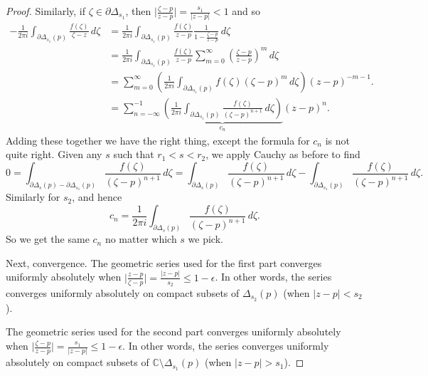 \documentclass[12pt,openany]{book}
\newcommand{\sabs}[1]{\lvert {#1} \rvert}
\newcommand{\babs}[1]{\bigl\lvert {#1} \bigr\rvert}
\newcommand{\C}{{\mathbb{C}}}
\theoremstyle{plain}
\theoremstyle{remark}
\theoremstyle{definition}
\theoremstyle{exercise}
\theoremstyle{example}
\begin{document}
\begin{proof}
Similarly, 
if $\zeta \in \partial \Delta_{s_1}$, then
$\babs{\frac{\zeta-p}{z-p}} = \frac{s_1}{\sabs{z-p}} < 1$ and so
\begin{equation*}
\begin{split}
-\frac{1}{2\pi i}
\int_{\partial \Delta_{s_1}(p)} \frac{f(\zeta)}{\zeta-z} \, d\zeta 
& = 
\frac{1}{2\pi i}
\int_{\partial \Delta_{s_1}(p)} \frac{f(\zeta)}{z-p}
\frac{1}{1-\frac{\zeta-p}{z-p}} \, d\zeta
\\
& =
\frac{1}{2\pi i}
\int_{\partial \Delta_{s_1}(p)} \frac{f(\zeta)}{z-p}
\sum_{m=0}^\infty
{\left(\frac{\zeta-p}{z-p}\right)}^m \, d\zeta
\\
& =
\sum_{m=0}^\infty
\left(
\frac{1}{2\pi i}
\int_{\partial \Delta_{s_1}(p)} f(\zeta){(\zeta-p)}^{m}
 \, d\zeta
\right)
{(z-p)}^{-m-1} .
\\
& =
\sum_{n=-\infty}^{-1}
\underbrace{
\left(
\frac{1}{2\pi i}
\int_{\partial \Delta_{s_1}(p)} \frac{f(\zeta)}{{(\zeta-p)}^{n+1}}
 \, d\zeta
\right)
}_{c_n}
{(z-p)}^{n} .
\end{split}
\end{equation*}
Adding these together we have the right thing, except the formula for $c_n$
is not quite right.  Given any $s$ such that
$r_1 < s < r_2$, we apply Cauchy as before to find
\begin{equation*}
0 = \int_{\partial \Delta_{s}(p) - \partial \Delta_{s_1}(p)}
\frac{f(\zeta)}{{(\zeta-p)}^{n+1}} \, d\zeta
=
\int_{\partial \Delta_{s}(p)}
\frac{f(\zeta)}{{(\zeta-p)}^{n+1}} \, d\zeta
-
\int_{\partial \Delta_{s_1}(p)}
\frac{f(\zeta)}{{(\zeta-p)}^{n+1}} \, d\zeta .
\end{equation*}
Similarly for $s_2$, and hence
\begin{equation*}
c_n = \frac{1}{2\pi i}
\int_{\partial \Delta_{s}(p)} \frac{f(\zeta)}{{(\zeta-p)}^{n+1}}
 \, d\zeta .
\end{equation*}
So we get the same $c_n$ no matter which $s$ we pick.

Next, convergence.
The geometric series used for the first part converges uniformly
absolutely when $\babs{\frac{z-p}{\zeta-p}} = \frac{\sabs{z-p}}{s_2} \leq
1-\epsilon$.  In other words, the series converges uniformly absolutely
on compact subsets of $\Delta_{s_2}(p)$ (when $\sabs{z-p} < s_2$).

The geometric series used for the second part converges uniformly
absolutely when $\babs{\frac{\zeta-p}{z-p}} = \frac{s_1}{\sabs{z-p}} \leq
1-\epsilon$.  In other words, the series converges uniformly absolutely
on compact subsets of $\C \setminus \Delta_{s_1}(p)$ (when $\sabs{z-p} > s_1$).


\end{proof}
\end{document}
